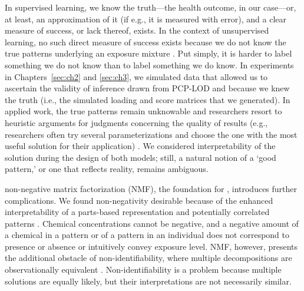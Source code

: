 In supervised learning, we know the truth---the health outcome, in our case---or, at least, an approximation of it (if e.g., it is measured with error), and a clear measure of success, or lack thereof, exists. In the context of unsupervised learning, no such direct measure of success exists because we do not know the true patterns underlying an exposure mixture \citep{ISLR}. Put simply, it is harder to label something we do not know than to label something we do know. In experiments in Chapters~\ref{sec:ch2} and \ref{sec:ch3}, we simulated data that allowed us to ascertain the validity of inference drawn from PCP-LOD and \bnmf because we knew the truth (i.e., the simulated loading and score matrices that we generated). In applied work, the true patterns remain unknowable and researchers resort to heuristic arguments for judgments concerning the quality of results (e.g., researchers often try several parameterizations and choose the one with the most useful solution for their application) \citep{friedman2001elements}. We considered interpretability of the solution during the design of both models; still, a natural notion of a `good pattern,' or one that reflects reality, remains ambiguous. 

non-negative matrix factorization (NMF), the foundation for \bnmfc, introduces further complications. We found non-negativity desirable because of the enhanced interpretability of a parts-based representation and potentially correlated patterns \citep{lee1999learning, lee2001}. Chemical concentrations cannot be negative, and a negative amount of a chemical in a pattern or of a pattern in an individual does not correspond to presence or absence or intuitively convey exposure level. NMF, however, presents the additional obstacle of non-identifiability, where multiple decompositions are observationally equivalent \citep{donoho2004does}. Non-identifiability is a problem because multiple solutions are equally likely, but their interpretations are not necessarily similar. 

